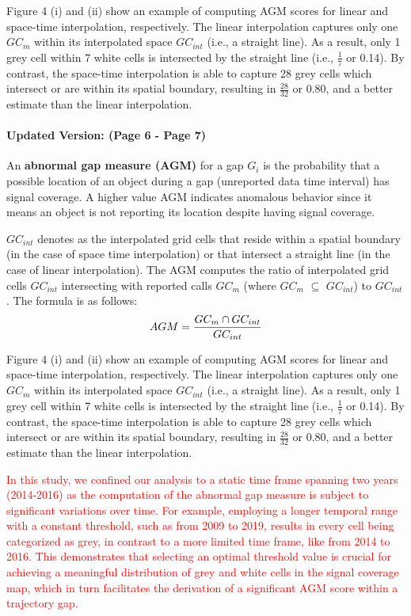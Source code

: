 \documentclass[twoside,leqno,onecolumn]{article}
\begin{document}
Figure 4 (i) and (ii) show an example of computing AGM scores for linear and space-time interpolation, respectively. The linear interpolation captures only one $GC_{m}$ within its interpolated space $GC_{int}$ (i.e., a straight line). As a result, only 1 grey cell within 7 white cells is intersected by the straight line (i.e., $\frac{1}{7}$ or 0.14). By contrast, the space-time interpolation is able to capture 28 grey cells which intersect or are within its spatial boundary, resulting in $\frac{28}{32}$ or 0.80, and a better estimate than the linear interpolation.\\

\paragraph{Updated Version: (Page 6 - Page 7)}
An \textbf{abnormal gap measure (AGM)} for a gap $G_{i}$ is the probability that a possible location of an object during a gap (unreported data time interval) has signal coverage. A higher value AGM indicates anomalous behavior since it means an object is not reporting its location despite having signal coverage.

$GC_{int}$ denotes as the interpolated grid cells that reside within a spatial boundary (in the case of space time interpolation) or that intersect a  straight line (in the case of linear interpolation). The AGM computes the ratio of interpolated grid cells $GC_{int}$ intersecting with reported calls $GC_{m}$ (where $GC_{m}$ $\subseteq$ $GC_{int}$) to $GC_{int}$ . The formula is as follows:
\begin{equation}
\centering
   AGM = \frac{GC_{m} \cap GC_{int}}{GC_{int}}
\end{equation}

Figure 4 (i) and (ii) show an example of computing AGM scores for linear and space-time interpolation, respectively. The linear interpolation captures only one $GC_{m}$ within its interpolated space $GC_{int}$ (i.e., a straight line). As a result, only 1 grey cell within 7 white cells is intersected by the straight line (i.e., $\frac{1}{7}$ or 0.14). By contrast, the space-time interpolation is able to capture 28 grey cells which intersect or are within its spatial boundary, resulting in $\frac{28}{32}$ or 0.80, and a better estimate than the linear interpolation. 

\textcolor{red}{In this study, we confined our analysis to a static time frame spanning two years (2014-2016) as the computation of the abnormal gap measure is subject to significant variations over time. For example, employing a longer temporal range with a constant threshold, such as from 2009 to 2019, results in every cell being categorized as grey, in contrast to a more limited time frame, like from 2014 to 2016. This demonstrates that selecting an optimal threshold value is crucial for achieving a meaningful distribution of grey and white cells in the signal coverage map, which in turn facilitates the derivation of a significant AGM score within a trajectory gap.}
\end{document}
